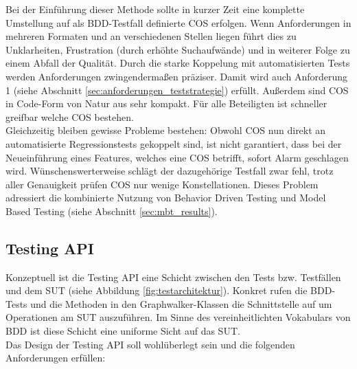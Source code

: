 Bei der Einführung dieser Methode sollte in kurzer Zeit eine komplette Umstellung auf als BDD-Testfall definierte \Gls{COS} erfolgen. Wenn Anforderungen in mehreren Formaten und an verschiedenen Stellen liegen führt dies zu Unklarheiten, Frustration (durch erhöhte Suchaufwände) und in weiterer Folge zu einem Abfall der Qualität. Durch die starke Koppelung mit automatisierten Tests werden Anforderungen zwingendermaßen präziser. Damit wird auch Anforderung 1 (siehe Abschnitt \ref{sec:anforderungen_teststrategie}) erfüllt. Außerdem sind \Gls{COS} in Code-Form von Natur aus sehr kompakt. Für alle Beteiligten ist schneller greifbar welche \Gls{COS} bestehen.\\
Gleichzeitig bleiben gewisse Probleme bestehen: Obwohl \Gls{COS} nun direkt an automatisierte Regressionstests gekoppelt sind, ist nicht garantiert, dass bei der Neueinführung eines Features, welches eine \Gls{COS} betrifft, sofort Alarm geschlagen wird. Wünschenswerterweise schlägt der dazugehörige Testfall zwar fehl, trotz aller Genauigkeit prüfen \Gls{COS} nur wenige Konstellationen. Dieses Problem adressiert die kombinierte Nutzung von Behavior Driven Testing und Model Based Testing (siehe Abschnitt \ref{sec:mbt_results}).

\subsection{Testing API}
\label{sec:testing_api}
Konzeptuell ist die Testing API eine Schicht zwischen den Tests bzw. Testfällen und dem \Gls{SUT} (siehe Abbildung \ref{fig:testarchitektur}). Konkret rufen die BDD-Tests und die Methoden in den Graphwalker-Klassen die Schnittstelle auf um Operationen am \Gls{SUT} auszuführen. Im Sinne des vereinheitlichten Vokabulars von BDD ist diese Schicht eine uniforme Sicht auf das SUT.\\
Das Design der Testing API soll wohlüberlegt sein und die folgenden Anforderungen erfüllen:

